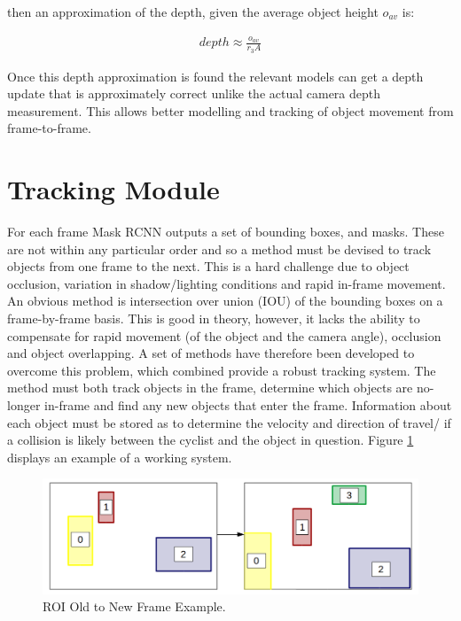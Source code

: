 \documentclass[11pt,twoside]{report}
\begin{document}
then an approximation of the depth, given the average object height $o_{av}$ is:

\begin{equation}
\begin{aligned}
depth \approx \frac{o_{av}}{r_{3}A} 
\end{aligned}
\end{equation}

Once this depth approximation is found the relevant models can get a depth update that is approximately correct unlike the actual camera depth measurement. This allows better modelling and tracking of object movement from frame-to-frame.

\section{Tracking Module}

For each frame Mask RCNN outputs a set of bounding boxes, and masks. These are not within any particular order and so a method must be devised to track objects from one frame to the next. This is a hard challenge due to object occlusion, variation in shadow/lighting conditions and rapid in-frame movement. An obvious method is intersection over union (IOU) of the bounding boxes on a frame-by-frame basis. This is good in theory, however, it lacks the ability to compensate for rapid movement (of the object and the camera angle), occlusion and object overlapping. A set of methods have therefore been developed to overcome this problem, which combined provide a robust tracking system.
\newline \newline
The method must both track objects in the frame, determine which objects are no-longer in-frame and find any new objects that enter the frame. Information about each object must be stored as to determine the velocity and direction of travel/ if a collision is likely between the cyclist and the object in question. Figure \ref{roi_match} displays an example of a working system.

\noindent \begin{figure}[h!]
	\includegraphics[width = 1.0\hsize]{figures/roi_match.png}
	\caption{ROI Old to New Frame Example.}
	\label{roi_match}
\end{figure}
\end{document}
